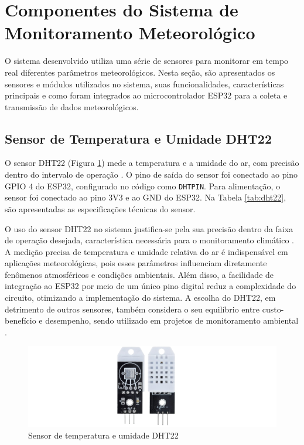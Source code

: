 \section{Componentes do Sistema de Monitoramento Meteorológico}

O sistema desenvolvido utiliza uma série de sensores para monitorar em tempo real diferentes parâmetros meteorológicos. Nesta seção, são apresentados os sensores e módulos utilizados no sistema, suas funcionalidades, características principais e como foram integrados ao microcontrolador ESP32 para a coleta e transmissão de dados meteorológicos.

\subsection{Sensor de Temperatura e Umidade DHT22}

O sensor DHT22 (Figura \ref{figura:dht22}) mede a temperatura e a umidade do ar, com precisão dentro do intervalo de operação \parencite{DHT22}. O pino de saída do sensor foi conectado ao pino GPIO 4 do ESP32, configurado no código como \texttt{DHTPIN}. Para alimentação, o sensor foi conectado ao pino 3V3 e ao GND do ESP32. Na Tabela \ref{tab:dht22}, são apresentadas as especificações técnicas do sensor.

O uso do sensor DHT22 no sistema justifica-se pela sua precisão dentro da faixa de operação desejada, característica necessária para o monitoramento climático \parencite{DHT22}. A medição precisa de temperatura e umidade relativa do ar é indispensável em aplicações meteorológicas, pois esses parâmetros influenciam diretamente fenômenos atmosféricos e condições ambientais. Além disso, a facilidade de integração ao ESP32 por meio de um único pino digital reduz a complexidade do circuito, otimizando a implementação do sistema. A escolha do DHT22, em detrimento de outros sensores, também considera o seu equilíbrio entre custo-benefício e desempenho, sendo utilizado em projetos de monitoramento ambiental \parencite{ferrandez2018precision,Francisco_precision2024}.

\begin{figure}[!htb] \centering
  \caption{Sensor de temperatura e umidade DHT22} \label{figura:dht22}
  \begin{varwidth}{\linewidth}
    \includegraphics[width=16cm]{figuras/DHT22.png}
  \end{varwidth}
\end{figure}

